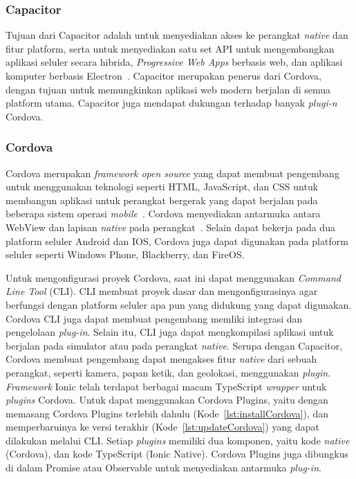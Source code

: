 \subsubsection{Capacitor}
\label{subsec:capacitor}
Tujuan dari Capacitor adalah untuk menyediakan akses ke perangkat {\it native} dan fitur platform, serta untuk menyediakan satu set API untuk mengembangkan aplikasi seluler secara hibrida, {\it Progressive Web Apps} berbasis web, dan aplikasi komputer berbasis Electron~\cite{tor:19:software}. Capacitor merupakan penerus dari Cordova, dengan tujuan untuk memungkinkan aplikasi web modern berjalan di semua platform utama. Capacitor juga mendapat dukungan terhadap banyak {\it plugi-n} Cordova.

\subsubsection{Cordova}
\label{subsec:cordova}
Cordova merupakan {\it framework open source} yang dapat membuat pengembang untuk menggunakan teknologi seperti HTML, JavaScript, dan CSS untuk membangun aplikasi untuk perangkat bergerak yang dapat berjalan pada beberapa sistem operasi {\it mobile}~\cite{gonsalves:18:evaluating}. Cordova menyediakan antarmuka antara WebView dan lapisan {\it native} pada perangkat~\cite{griffith:17:mobile}. Selain dapat bekerja pada dua platform seluler Android dan IOS, Cordova juga dapat digunakan pada platform seluler seperti Windows Phone, Blackberry, dan FireOS.

Untuk mengonfigurasi proyek Cordova, saat ini dapat menggunakan {\it Command Line Tool} (CLI). CLI membuat proyek dasar dan mengonfigurasinya agar berfungsi dengan platform seluler apa pun yang didukung yang dapat digunakan. Cordova CLI juga dapat membuat pengembang memliki integrasi dan pengelolaan {\it plug-in}. Selain itu, CLI juga dapat mengkompilasi aplikasi untuk berjalan pada simulator atau pada perangkat {\it native}. Serupa dengan Capacitor, Cordova membuat pengembang dapat mengakses fitur {\it native} dari sebuah perangkat, seperti kamera, papan ketik, dan geolokasi, menggunakan {\it plugin}. {\it Framework} Ionic telah terdapat berbagai macam TypeScript {\it wrapper} untuk {\it plugins} Cordova.  Untuk dapat menggunakan Cordova Plugins, yaitu dengan memasang Cordova Plugins terlebih dahulu (Kode~\ref{lst:installCordova}), dan memperbaruinya ke versi terakhir (Kode~\ref{lst:updateCordova}) yang dapat dilakukan melalui CLI. Setiap {\it plugins} memiliki dua komponen, yaitu kode {\it native} (Cordova), dan kode TypeScript (Ionic Native). Cordova Plugins juga dibungkus di dalam Promise atau Observable untuk menyediakan antarmuka {\it plug-in}.

